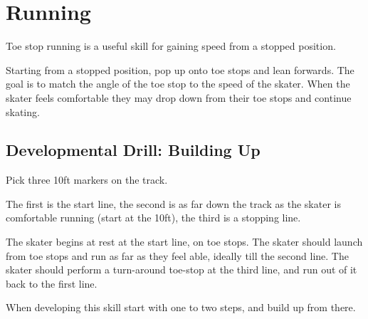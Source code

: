 \section{Running}
\label{sec:toe_stop/running}

Toe stop running is a useful skill for gaining speed from a stopped position. 

Starting from a stopped position, pop up onto toe stops and lean forwards.    
The goal is to match the angle of the toe stop to the speed of the skater.
When the skater feels comfortable they may drop down from their toe stops and continue skating.


\subsection*{Developmental Drill: Building Up}
\label{drill:toe_stop/running/development} 

Pick three 10ft markers on the track.

The first is the start line, the second is as far down the track as the skater is comfortable running (start at the 10ft), the third is a stopping line.    


The skater begins at rest at the start line, on toe stops.  
The skater should launch from toe stops and run as far as they feel able, ideally till the second line.  
The skater should perform a turn-around toe-stop at the third line, and run out of it back to the first line. 

When developing this skill start with one to two steps, and build up from there. 
